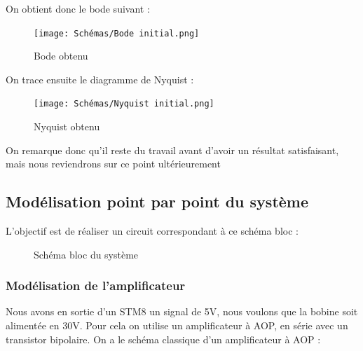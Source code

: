 \documentclass[11pt,a4paper]{article}
\begin{document}
\pagebreak
On obtient donc le bode suivant :
\begin{figure} [H]
\begin{center}
\texttt{[image: Schémas/Bode initial.png]} 
\end{center}
\caption{Bode obtenu}
\label{fig:Bode initial}
\end{figure}

On trace ensuite le diagramme de Nyquist :
\begin{figure} [H]
\begin{center}
\texttt{[image: Schémas/Nyquist initial.png]} 
\end{center}
\caption{Nyquist obtenu}
\label{fig:Nyquist initial}
\end{figure}

On remarque donc qu'il reste du travail avant d'avoir un résultat satisfaisant, mais nous reviendrons sur ce point ultérieurement

\subsection{Modélisation point par point du système}
\label{Modélisation point par point}
L'objectif est de réaliser un circuit correspondant à ce schéma bloc :

\begin{figure} [H]
\begin{center}
\end{center}
\caption{Schéma bloc du système}
\label{fig:Schéma bloc}
\end{figure}

\subsubsection{Modélisation de l'amplificateur}
\label{Modélisation ampli}
Nous avons en sortie d'un STM8 un signal de 5V, nous voulons que la bobine soit alimentée en 30V. Pour cela on utilise un amplificateur à AOP, en série avec un transistor bipolaire. On a le schéma classique d'un amplificateur à AOP :
\end{document}
